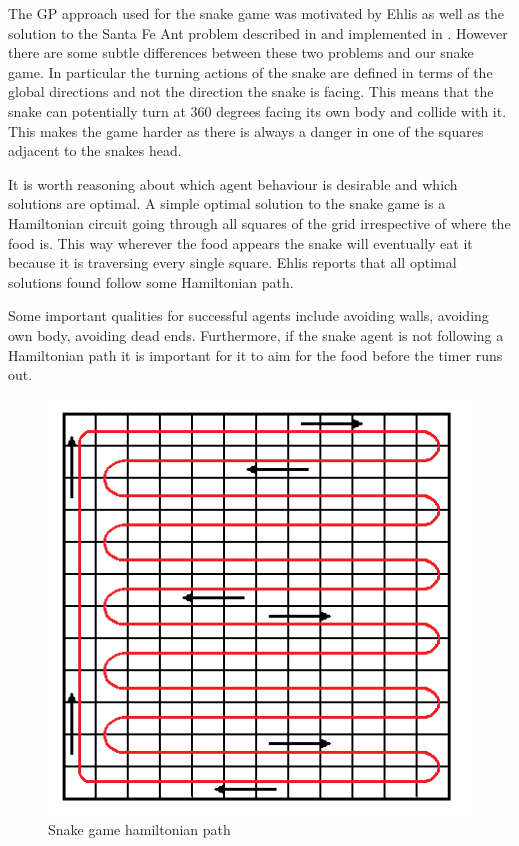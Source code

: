 \documentclass[12pt,a4paper]{article}
\begin{document}
	The GP approach used for the snake game was motivated by Ehlis \cite{ehlis_application_2000} as well as the solution to the Santa Fe Ant problem described in \cite{koza_genetic_1992} and implemented in \cite{noauthor_artificial_nodate}. However there are some subtle differences between these two problems and our snake game. In particular the turning actions of the snake are defined in terms of the global directions and not the direction the snake is facing. This means that the snake can potentially turn at 360 degrees facing its own body and collide with it. This makes the game harder as there is always a danger in one of the squares adjacent to the snakes head. 
	
	It is worth reasoning about which agent behaviour is desirable and which solutions are optimal. A simple optimal solution to the snake game is a Hamiltonian circuit \cite{noauthor_hamiltonian_2017} going through all squares of the grid irrespective of where the food is. This way wherever the food appears the snake will eventually eat it because it is traversing every single square. Ehlis \cite{ehlis_application_2000} reports that all optimal solutions found follow some Hamiltonian path.
	
	Some important qualities for successful agents include avoiding walls, avoiding own body, avoiding dead ends. Furthermore, if the snake agent is not following a Hamiltonian path it is important for it to aim for the food before the timer runs out.
	
	\begin{figure}[h!]
		\centering
		\includegraphics[width=0.7\linewidth]{figures/hamiltonian}
		\caption{Snake game hamiltonian path}
		\label{fig:ham_path}
	\end{figure}
	
\end{document}
